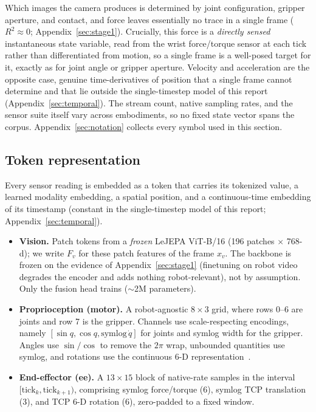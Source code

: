 \documentclass{article}
\begin{document}
Which images the camera produces is determined by joint configuration, gripper aperture, and contact, and force leaves essentially no trace in a single frame ($R^2 \approx 0$; Appendix~\ref{sec:stage1}). Crucially, this force is a \emph{directly sensed} instantaneous state variable, read from the wrist force/torque sensor at each tick rather than differentiated from motion, so a single frame is a well-posed target for it, exactly as for joint angle or gripper aperture. Velocity and acceleration are the opposite case, genuine time-derivatives of position that a single frame cannot determine and that lie outside the single-timestep model of this report (Appendix~\ref{sec:temporal}). The stream count, native sampling rates, and the sensor suite itself vary across embodiments, so no fixed state vector spans the corpus. Appendix~\ref{sec:notation} collects every symbol used in this section.

\subsection{Token representation}
\label{sec:tokenization}
Every sensor reading is embedded as a token that carries its tokenized value, a learned modality embedding, a spatial position, and a continuous-time embedding of its timestamp (constant in the single-timestep model of this report; Appendix~\ref{sec:temporal}).

\begin{itemize}
  \item \textbf{Vision.} Patch tokens from a \emph{frozen} LeJEPA ViT-B/16
        (196 patches $\times$ 768-d); we write $F_v$ for these patch features of the frame $x_v$. The backbone is frozen on the evidence of Appendix~\ref{sec:stage1} (finetuning on robot video degrades the encoder and adds nothing robot-relevant), not by assumption. Only the fusion head trains ($\sim$2M parameters).
  \item \textbf{Proprioception (motor).} A robot-agnostic $8\times3$ grid, where rows
        0--6 are joints and row 7 is the gripper. Channels use scale-respecting encodings, namely $[\sin q, \cos q, \mathrm{symlog}\,\dot q]$ for joints and symlog width for the gripper. Angles use $\sin/\cos$ to remove the $2\pi$ wrap, unbounded quantities use symlog, and rotations use the continuous 6-D representation~\citep{rot6d2019}.
  \item \textbf{End-effector (ee).} A $13\times15$ block of native-rate samples
        in the interval $[\text{tick}_k, \text{tick}_{k+1})$, comprising symlog force/torque (6), symlog TCP translation (3), and TCP 6-D rotation (6), zero-padded to a fixed window.
\end{itemize}
\end{document}
